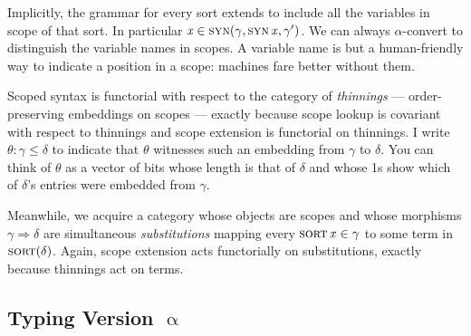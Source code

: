 \documentclass[format=acmsmall, screen, review, anonymous, timestamp]{acmart}
\newcommand{\V}[1]{\purple{\mathit{#1}}}
\newcommand{\x}[1]{\V{x_{\mathrm{#1}}}}
\begin{document}
Implicitly, the grammar for every sort extends to include all the variables in scope of that sort. In particular $\x{} \in \syn{\gamma,\bva{syn}x,\gamma'}$.
We can always $\alpha$-convert to distinguish the variable names in scopes. A variable name is but a human-friendly way to indicate a position in a scope: machines fare better without them.

Scoped syntax is functorial with respect to the category of \emph{thinnings} --- order-preserving embeddings on scopes --- exactly because scope lookup is covariant with respect to thinnings and scope extension is functorial on thinnings. I write $\theta : \gamma \le \delta$ to indicate that $\theta$ witnesses such an embedding from $\gamma$ to $\delta$. You can think of $\theta$ as a vector of bits whose length is that of $\delta$ and whose 1s show which of $\delta$'s entries were embedded from $\gamma$.

Meanwhile, we acquire a category whose objects are scopes and whose morphisms $\gamma \Rightarrow \delta$ are simultaneous \emph{substitutions} mapping every $\bva {sort}x \in \gamma$ to some term in $\textsc{sort}(\delta)$. Again, scope extension acts functorially on substitutions, exactly because thinnings act on terms.


\subsection{Typing Version $\upalpha$}
\end{document}
